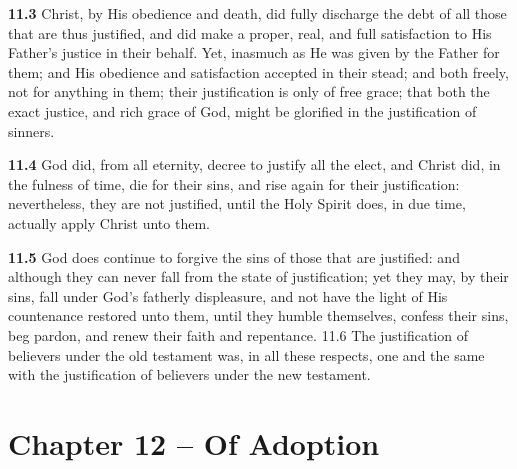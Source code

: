 \par\textbf{11.3} Christ, by His obedience and death, did fully discharge the debt of all those that are thus justified, and did make a proper, real, and full satisfaction to His Father{}'s justice in their behalf. Yet, inasmuch as He was given by the Father for them; and His obedience and satisfaction accepted in their stead; and both freely, not for anything in them; their justification is only of free grace; that both the exact justice, and rich grace of God, might be glorified in the justification of sinners.   

\par\textbf{11.4} God did, from all eternity, decree to justify all the elect, and Christ did, in the fulness of time, die for their sins, and rise again for their justification: nevertheless, they are not justified, until the Holy Spirit does, in due time, actually apply Christ unto them.   

\par\textbf{11.5} God does continue to forgive the sins of those that are justified: and although they can never fall from the state of justification; yet they may, by their sins, fall under God's fatherly displeasure, and not have the light of His countenance restored unto them, until they humble themselves, confess their sins, beg pardon, and renew their faith and repentance.   11.6 The justification of believers under the old testament was, in all these respects, one and the same with the justification of believers under the new testament.  

\section{Chapter 12 -- Of Adoption}

